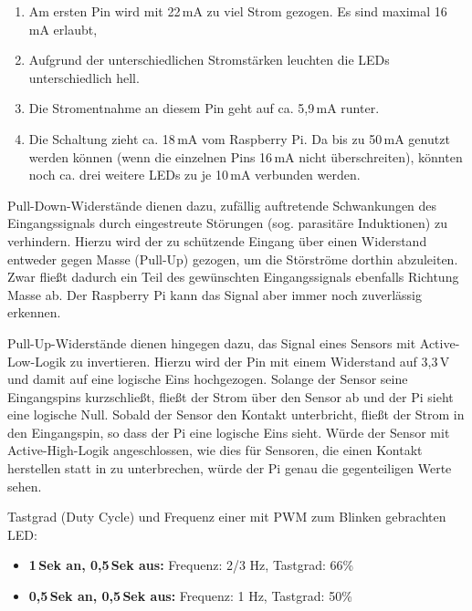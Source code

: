 \begin{enumerate}
    \item Am ersten Pin wird mit 22\,mA zu viel Strom gezogen. Es sind maximal
    16\,mA erlaubt,

    \item Aufgrund der unterschiedlichen Stromstärken leuchten die LEDs
    unterschiedlich hell.

    \item Die Stromentnahme an diesem Pin geht auf ca. 5,9\,mA runter.

    \item Die Schaltung zieht ca. 18\,mA vom Raspberry Pi. Da bis zu 50\,mA
    genutzt werden können (wenn die einzelnen Pins 16\,mA nicht überschreiten),
    könnten noch ca. drei weitere LEDs zu je 10\,mA verbunden werden.
\end{enumerate}


\teilaufgabe
Pull-Down-Widerstände dienen dazu, zufällig auftretende Schwankungen des Eingangssignals
durch eingestreute Störungen (sog. parasitäre Induktionen) zu verhindern. Hierzu wird
der zu schützende Eingang über einen Widerstand entweder gegen Masse (Pull-Up) gezogen,
um die Störströme dorthin abzuleiten. Zwar fließt dadurch ein Teil des gewünschten
Eingangssignals ebenfalls Richtung Masse ab. Der Raspberry Pi kann das Signal aber
immer noch zuverlässig erkennen.

Pull-Up-Widerstände dienen hingegen dazu, das Signal eines Sensors mit Active-Low-Logik
zu invertieren. Hierzu wird der Pin mit einem Widerstand auf 3,3\,V und damit auf eine
logische Eins hochgezogen. Solange der Sensor seine Eingangspins kurzschließt, fließt
der Strom über den Sensor ab und der Pi sieht eine logische Null. Sobald der Sensor den
Kontakt unterbricht, fließt der Strom in den Eingangspin, so dass der Pi eine logische
Eins sieht. Würde der Sensor mit Active-High-Logik angeschlossen, wie dies für Sensoren,
die einen Kontakt herstellen statt in zu unterbrechen, würde der Pi genau die gegenteiligen
Werte sehen.

\bigskip
\teilaufgabe
Tastgrad (Duty Cycle) und Frequenz einer mit PWM zum Blinken gebrachten LED:

\begin{itemize}
    \item \textbf{1\,Sek an, 0,5\,Sek aus:}
    Frequenz: 2/3 Hz, Tastgrad: 66\%

    \item \textbf{0,5\,Sek an, 0,5\,Sek aus:}
    Frequenz: 1 Hz, Tastgrad: 50\%
\end{itemize}

